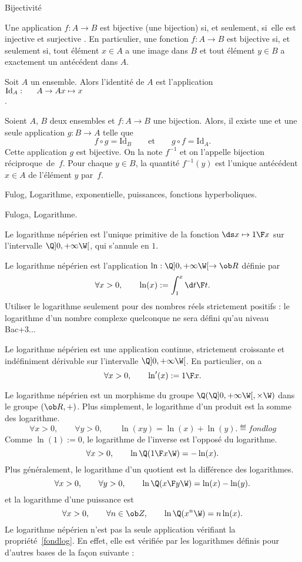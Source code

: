 \Concept [] Bijectivité

\Definition []  Une application $f:A\to B$ est bijective (une bijection) si, et seulement, si~elle est injective et surjective .
\bigskip \noindent En particulier, une fonction $f:A\to B$ est bijective si, et seulement si, tout élément $x\in A$ a une
image dans $B$ et tout élément $y\in B$ a exactement un antécédent dans $A$.  \bigskip


\Definition []  Soit $A$ un ensemble. Alors l'identité de $A$ est l'application $\mbox{Id}_A:\vtop{\mbox{$A\to A$}\mbox{$x\mapsto x$}}$.

\Propriete []  Soient $A$, $B$ deux ensembles et $f:A\to B$ une bijection. Alors, il existe une et une seule application $g:B\to
A$ telle que $$ {f\circ g=\mbox{Id}_B}\qquad\mbox{et}\qquad {g\circ f=\mbox{Id}_A}. $$ Cette application $g$ est bijective.
On la note $f^{-1}$ et on l'appelle bijection réciproque~de~$f$.  \medskip\noindent Pour chaque $y\in B$, la
quantité $f^{-1}(y)$ est l'unique antécédent $x\in A$ de l'élément $y$ par~$f$. \bigskip

 

\Section Fulog, Logarithme, exponentielle, puissances, fonctions hyperboliques.

\Subsection Fuloga, Logarithme.

\noindent
Le logarithme népérien est l'unique primitive de la fonction $\ds x\mapsto{1\F x}$ sur l'intervalle $\Q]0,+\infty\W[$, qui s'annule en $1$. 
\bigskip

\Definition []  Le logarithme népérien est l'application $\ln:\Q]0,+\infty\W[\to\ob R$ définie par 
$$
\forall x>0 , \qquad  \ln(x):=\int_1^x{\d t\F t }.
$$
\noindent\smash{\raise-3mm\llap{ }}Utiliser le logarithme seulement pour des nombres réels strictement positifs : 
le logarithme d'un nombre complexe quelconque ne sera défini qu'au niveau Bac+3...
\bigskip

Le logarithme népérien est une application continue, strictement croissante et in\-dé\-fi\-ni\-ment dé\-ri\-va\-ble sur l'intervalle $\Q]0,+\infty\W[$. En particulier, on a 
$$
\forall x>0 , \qquad \ln'(x):={1\F x }.
$$


Le logarithme népérien est un morphisme du groupe $\Q(\Q]0,+\infty\W[,\times\W)$ dans le groupe $(\ob R,+)$. Plus simplement, 
le logarithme d'un produit est la somme des logarithme. 
$$
\forall x>0 , \qquad \forall y>0 , \qquad \ln(xy)=\ln(x)+\ln(y). \eqdef{fondlog}
$$
Comme $\ln(1):=0$, le logarithme de l'inverse est l'opposé du logarithme. 
$$
\forall x>0, \qquad {\ln\Q({1\F x}\W)=-\ln(x)}. 
$$
Plus généralement, le logarithme d'un quotient est la différence des logarithmes.
$$
\forall x>0 , \qquad \forall y>0 , \qquad{\ln\Q({x\F y}\W)=\ln(x)-\ln(y)}.
$$
et la logarithme d'une puissance est 
$$
\forall x>0 , \qquad \forall n\in\ob Z , \qquad\ln\Q(x^n\W)=n\ln(x).
$$
Le logarithme népérien n'est pas la seule application vérifiant la propriété~\eqref{fondlog}. En effet, elle est vérifiée 
par les logarithmes définis pour d'autres bases de la fa\c con suivante : 
\bigskip 

